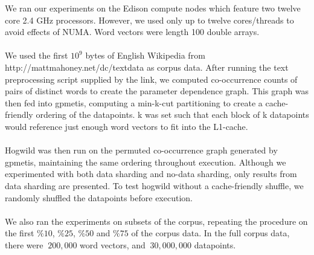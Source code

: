 \documentclass[times,11pt]{article}
\numberwithin{equation}{section}		%
\numberwithin{figure}{section}			%
\numberwithin{table}{section}				%
\begin{document}
We ran our experiments on the Edison compute nodes which feature two
twelve core 2.4 GHz processors. However, we used only up to twelve
cores/threads to avoid effects of NUMA. Word vectors were length 100
double arrays.
\\\\
We used the first $10^9$ bytes of English Wikipedia from
http://mattmahoney.net/dc/textdata as corpus data. After running the text
preprocessing script supplied by the link, we computed co-occurrence
counts of pairs of distinct words to create the parameter dependence graph.
This graph was then fed into gpmetis, computing a min-k-cut partitioning to
create a cache-friendly ordering of the datapoints. k was set such that each
block of k datapoints would reference just enough word vectors to fit into the
L1-cache.
\\\\
Hogwild was then run on the permuted co-occurrence graph generated by gpmetis,
maintaining the same ordering throughout execution. Although we experimented with
both data sharding and no-data sharding, only results from data sharding are presented.
To test hogwild without a cache-friendly shuffle, we randomly shuffled the datapoints before execution.
\\\\
We also ran the experiments on subsets of the corpus, repeating the
procedure on the first $\%10$, $\%25$, $\%50$ and $\%75$ of the corpus data.
In the full corpus data, there were $~200,000$ word vectors, and $~30,000,000$
datapoints.
\end{document}
